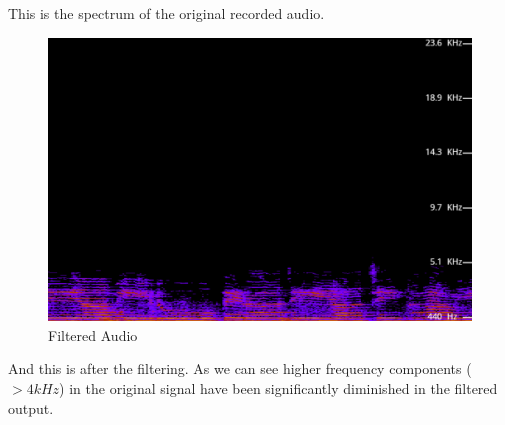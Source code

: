 \documentclass[journal,12pt,twocolumn]{IEEEtran}
\theoremstyle{remark}
\begin{document}
\begin{enumerate}[label=\thesection.\arabic*
,ref=\thesection.\theenumi]
\newline
This is the spectrum of the original recorded audio.
\begin{figure}[h!]
    \centering
    \includegraphics[width=0.7\columnwidth]{figs/out_sig.png}
    \caption{Filtered Audio}
    \label{fig:filtered_audio}
\end{figure}
\newline
And this is after the filtering. As we can see higher frequency components ($>4kHz$) in the original signal have been significantly diminished in the filtered output.
\end{enumerate}
\end{document}

